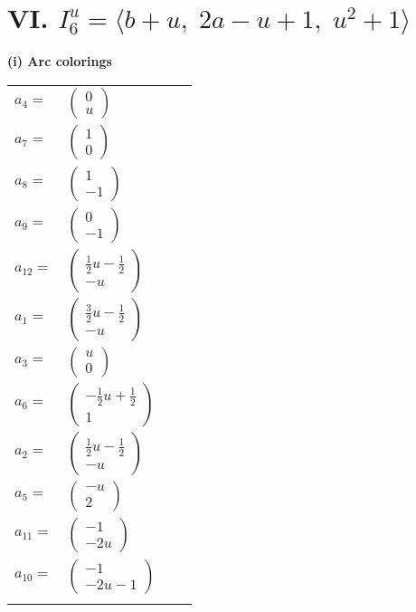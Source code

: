 \documentclass[1p]{elsarticle_modified}
\theoremstyle{definition}
\begin{document}
\centering \section*{VI. $I^u_{6}= \langle b+u,\;2 a- u+1,\;u^2+1 \rangle$}
\flushleft \textbf{(i) Arc colorings}\\
\begin{tabular}{m{7pt} m{180pt} m{7pt} m{180pt} }
\flushright $a_{4}=$&$\begin{pmatrix}0\\u\end{pmatrix}$ \\
\flushright $a_{7}=$&$\begin{pmatrix}1\\0\end{pmatrix}$ \\
\flushright $a_{8}=$&$\begin{pmatrix}1\\-1\end{pmatrix}$ \\
\flushright $a_{9}=$&$\begin{pmatrix}0\\-1\end{pmatrix}$ \\
\flushright $a_{12}=$&$\begin{pmatrix}\frac{1}{2} u-\frac{1}{2}\\- u\end{pmatrix}$ \\
\flushright $a_{1}=$&$\begin{pmatrix}\frac{3}{2} u-\frac{1}{2}\\- u\end{pmatrix}$ \\
\flushright $a_{3}=$&$\begin{pmatrix}u\\0\end{pmatrix}$ \\
\flushright $a_{6}=$&$\begin{pmatrix}-\frac{1}{2} u+\frac{1}{2}\\1\end{pmatrix}$ \\
\flushright $a_{2}=$&$\begin{pmatrix}\frac{1}{2} u-\frac{1}{2}\\- u\end{pmatrix}$ \\
\flushright $a_{5}=$&$\begin{pmatrix}- u\\2\end{pmatrix}$ \\
\flushright $a_{11}=$&$\begin{pmatrix}-1\\-2 u\end{pmatrix}$ \\
\flushright $a_{10}=$&$\begin{pmatrix}-1\\-2 u-1\end{pmatrix}$\\&\end{tabular}
\end{document}
